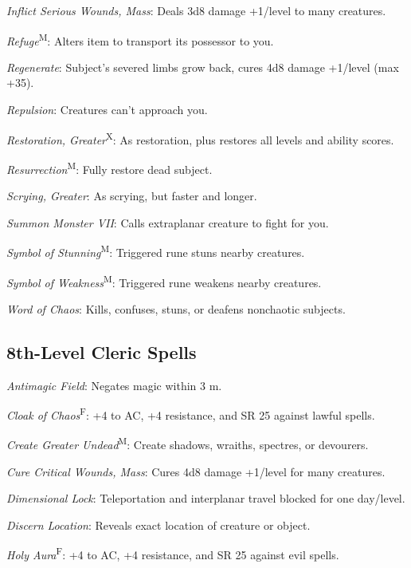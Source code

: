 \textit{Inflict Serious Wounds, Mass}: Deals 3d8 damage +1/level to many creatures.

\textit{Refuge}\textsuperscript{M}: Alters item to transport its possessor to you.

\textit{Regenerate}: Subject's severed limbs grow back, cures 4d8 damage +1/level (max +35).

\textit{Repulsion}: Creatures can't approach you.

\textit{Restoration, Greater}\textsuperscript{X}: As restoration, plus restores all levels and ability scores.

\textit{Resurrection}\textsuperscript{M}: Fully restore dead subject.

\textit{Scrying, Greater}: As scrying, but faster and longer.

\textit{Summon Monster VII}: Calls extraplanar creature to fight for you.

\textit{Symbol of Stunning}\textsuperscript{M}: Triggered rune stuns nearby creatures.

\textit{Symbol of Weakness}\textsuperscript{M}: Triggered rune weakens nearby creatures.

\textit{Word of Chaos}: Kills, confuses, stuns, or deafens nonchaotic subjects.



\subsection{8th-Level Cleric Spells}

\textit{Antimagic Field}: Negates magic within 3 m.

\textit{Cloak of Chaos}\textsuperscript{F}: +4 to AC, +4 resistance, and SR 25 against lawful spells.

\textit{Create Greater Undead}\textsuperscript{M}: Create shadows, wraiths, spectres, or devourers.

\textit{Cure Critical Wounds, Mass}: Cures 4d8 damage +1/level for many creatures.

\textit{Dimensional Lock}: Teleportation and interplanar travel blocked for one day/level.

\textit{Discern Location}: Reveals exact location of creature or object.



\textit{Holy Aura}\textsuperscript{F}: +4 to AC, +4 resistance, and SR 25 against evil spells.

